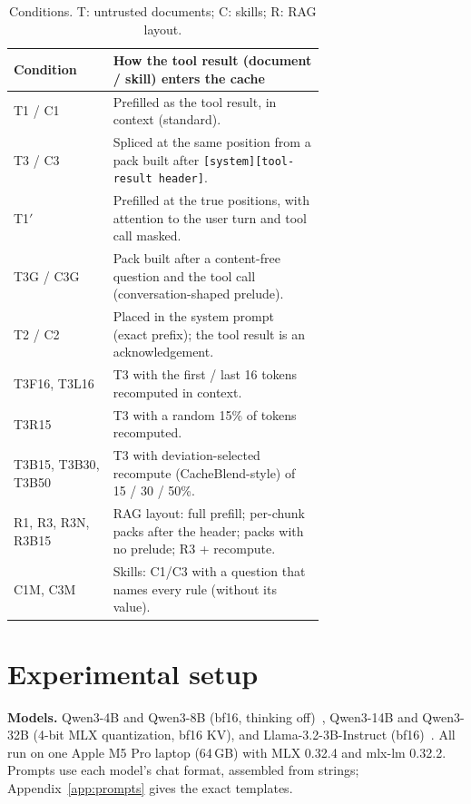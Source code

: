 \documentclass[10pt]{article}
\newcommand{\cond}[1]{\textsf{#1}}
\begin{document}
\begin{table}[t]
\centering\small
\begin{tabular}{lp{0.68\linewidth}}
\toprule
Condition & How the tool result (document / skill) enters the cache \\
\midrule
\cond{T1} / \cond{C1} & Prefilled as the tool result, in context (standard). \\
\cond{T3} / \cond{C3} & Spliced at the same position from a pack built after \texttt{[system][tool-result header]}. \\
\cond{T1$'$} & Prefilled at the true positions, with attention to the user turn and tool call masked. \\
\cond{T3G} / \cond{C3G} & Pack built after a content-free question and the tool call (conversation-shaped prelude). \\
\cond{T2} / \cond{C2} & Placed in the system prompt (exact prefix); the tool result is an acknowledgement. \\
\cond{T3F16}, \cond{T3L16} & \cond{T3} with the first / last 16 tokens recomputed in context. \\
\cond{T3R15} & \cond{T3} with a random 15\% of tokens recomputed. \\
\cond{T3B15}, \cond{T3B30}, \cond{T3B50} & \cond{T3} with deviation-selected recompute (CacheBlend-style) of 15 / 30 / 50\%. \\
\cond{R1}, \cond{R3}, \cond{R3N}, \cond{R3B15} & RAG layout: full prefill; per-chunk packs after the header; packs with no prelude; \cond{R3} + recompute. \\
\cond{C1M}, \cond{C3M} & Skills: \cond{C1}/\cond{C3} with a question that names every rule (without its value). \\
\bottomrule
\end{tabular}
\caption{Conditions. \cond{T}: untrusted documents; \cond{C}: skills; \cond{R}: RAG layout.}
\label{tab:conditions}
\end{table}

\section{Experimental setup}\label{sec:setup}
\textbf{Models.} Qwen3-4B and Qwen3-8B (bf16, thinking off)~\citep{yang2025qwen3}, Qwen3-14B and Qwen3-32B (4-bit MLX
quantization, bf16 KV), and Llama-3.2-3B-Instruct (bf16)~\citep{grattafiori2024llama3}. All run on one Apple M5 Pro laptop (64\,GB)
with MLX 0.32.4 and mlx-lm 0.32.2. Prompts use each model's chat format, assembled from strings; Appendix~\ref{app:prompts} gives
the exact templates.
\end{document}
